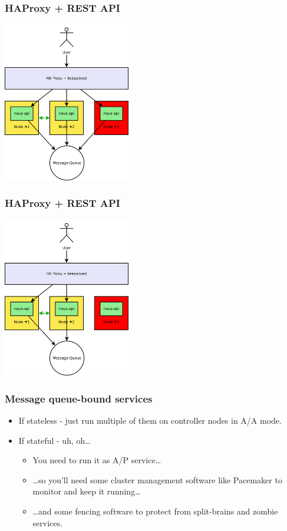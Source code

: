 \documentclass[aspectratio=43]{beamer}
\begin{document}
\begin{frame}
    \frametitle{HAProxy + REST API}
    \begin{center}
        \includegraphics[height=7cm]{images/haproxy2.png}
    \end{center}
\end{frame}

\begin{frame}
    \frametitle{HAProxy + REST API}
    \begin{center}
        \includegraphics[height=7cm]{images/haproxy3.png}
    \end{center}
\end{frame}

\begin{frame}
    \frametitle{Message queue-bound services}
    \begin{itemize}
        \item If stateless - just run multiple of them on controller nodes in A/A mode.
        \pause
        \item If stateful - uh, oh…
        \pause
        \begin{itemize}
            \item You need to run it as A/P service…
            \pause
            \item …so you'll need some cluster management software like Pacemaker to monitor and keep it running…
            \pause
            \item …and some fencing software to protect from split-brains and zombie services.
        \end{itemize}
    \end{itemize}
\end{frame}
\end{document}
